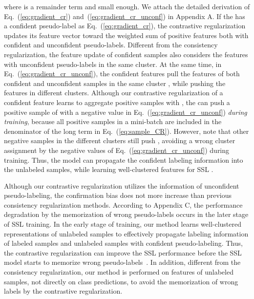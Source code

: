 \documentclass[letterpaper]{article} \usepackage{aaai22}  \usepackage{times}  \usepackage{helvet}  \usepackage{courier}  \usepackage[hyphens]{url}  \usepackage{graphicx} \urlstyle{rm} \def\UrlFont{\rm}  \usepackage{natbib}  \usepackage{caption} \DeclareCaptionStyle{ruled}{labelfont=normalfont,labelsep=colon,strut=off} \frenchspacing  \setlength{\pdfpagewidth}{8.5in}  \setlength{\pdfpageheight}{11in}  \usepackage{algorithm}
\begin{document}
where  is a remainder term and small enough.
We attach the detailed derivation of Eq.~(\ref{eq:gradient_cr}) and~(\ref{eq:gradient_cr_unconf}) in Appendix A.
If the  has a confident pseudo-label as Eq.~(\ref{eq:gradient_cr}), the contrastive regularization updates its feature vector  toward the weighted sum of positive features both with confident and unconfident pseudo-labels.
Different from the consistency regularization, the feature update of confident samples also considers the features with unconfident pseudo-labels in the same cluster.
At the same time, in Eq.~(\ref{eq:gradient_cr_unconf}), the confident features pull the features of both confident and unconfident samples in the same cluster , while pushing the features in different clusters.
Although our contrastive regularization of a confident feature  learns to aggregate positive samples with , the  can push a positive sample  of  with a negative value in Eq.~(\ref{eq:gradient_cr_unconf}) \textit{during training}, because all positive samples in a mini-batch are included in the denominator of the long term in Eq.~(\ref{eq:sample_CR}).
However, note that other negative samples in the different clusters still push , avoiding a wrong cluster assignment by the negative values of Eq.~(\ref{eq:gradient_cr_unconf}) during training.
Thus, the model can propagate the confident labeling information into the unlabeled samples, while learning well-clustered features for SSL \cite{castelli1996relative}.

Although our contrastive regularization utilizes the information of unconfident pseudo-labeling, the confirmation bias does not more increase than previous consistency regularization methods.
According to Appendix C, the performance degradation by the memorization of wrong pseudo-labels occurs in the later stage of SSL training.
In the early stage of training, our method learns well-clustered representations of unlabeled samples to effectively propagate labeling information of labeled samples and unlabeled samples with confident pseudo-labeling.
Thus, the contrastive regularization can improve the SSL performance before the SSL model starts to memorize wrong pseudo-labels~\cite{arpit2017closer}.
In addition, different from the consistency regularization, our method is performed on features of unlabeled samples, not directly on class predictions, to avoid the memorization of wrong labels by the contrastive regularization.
\end{document}
